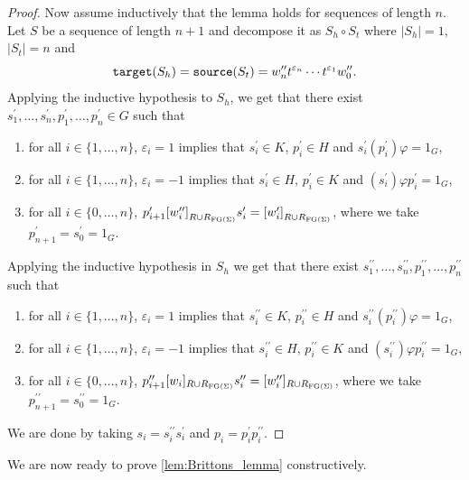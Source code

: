 \begin{proof}
  Now assume inductively that the lemma holds for sequences of length $n$. Let $S$ be a sequence
  of length $n+1$ and decompose it as $S_h\circ S_t$ where $|S_h| = 1$, $|S_t| = n$ and
  \[\texttt{target}(S_h) = \texttt{source}(S_t) = w^{\prime\prime}_n t^{\varepsilon_n}
  \cdots t^{\varepsilon_1} w_0^{\prime\prime}.\]
  Applying the inductive hypothesis to $S_h$, we get that there exist
  $s_1^\prime, \ldots, s_n^\prime, p_1^\prime, \ldots, p_n^\prime \in G$ such that
  \begin{enumerate}
    \item for all $i\in\{1, \ldots, n\}$, $\varepsilon_i = 1$ implies that $s^\prime_i\in K$,
      $p^\prime_i \in H$ and $s_i^\prime(p_i^\prime)\varphi = 1_G$,
    \item for all $i\in \{1, \ldots, n\}$, $\varepsilon_i = -1$ implies that $s_i^\prime\in H$,
      $p_i^\prime \in K$ and $(s_i^\prime)\varphi p_i^\prime = 1_G$,
    \item for all $i\in\{0, \ldots, n\}$,
      $p_{i+1}^\prime {[w_i^{\prime\prime}]}_{R\cup R_{\textrm{FG}(\Sigma)}} s_i^\prime =
        {[w_i^\prime]}_{R\cup R_{\textrm{FG}(\Sigma)}}$,
      where we take $p_{n+1}^\prime = s_0^\prime = 1_G$.
  \end{enumerate}
  Applying the inductive hypothesis in $S_h$ we get that there exist
  $s_1^{\prime\prime},\ldots, s_n^{\prime\prime}, p_1^{\prime\prime}, \ldots, p_n^{\prime\prime}$ such that
  \begin{enumerate}
    \item for all $i\in\{1, \ldots, n\}$, $\varepsilon_i = 1$ implies that $s^{\prime\prime}_i\in K$,
      $p^{\prime\prime}_i \in H$ and $s_i^{\prime\prime}(p_i^{\prime\prime})\varphi = 1_G$,
    \item for all $i\in \{1, \ldots, n\}$, $\varepsilon_i = -1$ implies that
      $s_i^{\prime\prime}\in H$, $p_i^{\prime\prime} \in K$ and $(s_i^{\prime\prime})\varphi
      p_i^{\prime\prime} = 1_G$,
    \item for all $i\in\{0, \ldots, n\}$, $p_{i+1}^{\prime\prime} [w_i]_{R\cup R_{\textrm{FG}(\Sigma)}}
      s_i^{\prime\prime} = [w_i^{\prime\prime}]_{R\cup R_{\textrm{FG}(\Sigma)}}$, where we take
      $p_{n+1}^{\prime\prime} = s_0^{\prime\prime} = 1_G$.
  \end{enumerate}
  We are done by taking $s_i = s_i^{\prime\prime} s_i^\prime$ and $p_i = p_i^\prime p_i^{\prime\prime}$.
\end{proof}

We are now ready to prove \cref{lem:Brittons_lemma} constructively.

